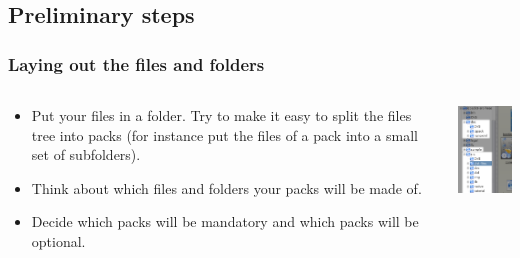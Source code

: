 \documentclass[compress,10pt]{beamer}
\begin{document}
\subsection{Preliminary steps}

\begin{frame}

\frametitle{Laying out the files and folders}

\begin{columns}

  \begin{column}{7cm}
  \begin{itemize}

    \item Put your files in a folder. Try to make it easy to split the
    files tree into packs (for instance put the files of a pack into a small set
    of subfolders).

    \item Think about which files and folders your packs will be made of.

    \item Decide which packs will be mandatory and which packs will be optional.

  \end{itemize}
  \end{column}

  \begin{column}{3cm}
  \includegraphics[width=3cm]{tree-view}
  \end{column}

\end{columns}

\end{frame}

\end{document}
